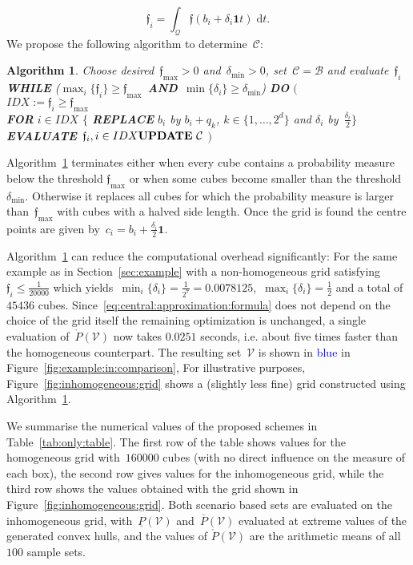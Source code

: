 \documentclass[letterpaper, 10pt, conference]{ieeeconf} %
\newtheorem{algo}[thm]{Algorithm}
\providecommand{\bfa}[1]{\mathbf{#1}}
\begin{document}
\[
\mathfrak{f}_i=\int_{\mathcal Q}\mathfrak{f}(b_i+\delta_i\bfa{1} t) \; \mathrm d t.
\]
%
We propose the following algorithm to determine~$\mathcal C$:
%
\begin{algo}\label{algo:non:homo:cubes}
Choose desired~$\mathfrak{f}_{\max}>0$ and~$\delta_{\min}>0$, set~$\mathcal C=\mathcal B$ and evaluate~$\mathfrak{f}_i$\\
\textbf{WHILE} ($\max_i\{\mathfrak{f}_i\}\geq\mathfrak{f}_{\max}$~\textbf{AND}~$\min\{\delta_i\}\geq\delta_{\min}$) \textbf{DO} $\bigl($\\
$IDX := \mathfrak{f}_i\geq \mathfrak{f}_{\max}$\\
\textbf{FOR} $i\in IDX$ $\{$ \textbf{REPLACE} $b_i$ by $b_i+q_k$, $k\in\{1,\dots,2^d\}$ 
and $\delta_i$ by~$\frac{\delta_i}{2}\}$\\
\textbf{EVALUATE}~$\mathfrak f_i, i\in IDX\\
\textbf{UPDATE}~\mathcal C$
$\bigr)$
\end{algo}
%
Algorithm~\ref{algo:non:homo:cubes} terminates either when every cube contains a probability measure below the threshold $\mathfrak{f}_{\max}$ or when some cubes become smaller than the threshold $\delta_{\min}$. Otherwise it replaces all cubes for which the probability measure is larger than~$\mathfrak{f}_{\max}$ with cubes with a halved side length.
%
Once the grid is found the centre points are given by~$c_i=b_i+\frac{\delta_i}{2}\bfa{1}$.
%


%
Algorithm~\ref{algo:non:homo:cubes} can reduce the computational overhead significantly:
%
For the same example as in Section~\ref{sec:example} with a non-homogeneous grid satisfying~$\mathfrak{f}_i\leq\frac{1}{20000}$ which yields~$\min_i\{\delta_i\}=\frac{1}{2^7}=0.0078125$,~$\max_i\{\delta_i\}=\frac{1}{2}$ and a total of~$45436$ cubes.
%
Since~\eqref{eq:central:approximation:formula} does not depend on the choice of the grid itself the remaining optimization is unchanged, a single evaluation of~$\mathring{P}(\mathcal V)$ now takes $0.0251$ seconds,
i.e. about five times  faster than the homogeneous counterpart. The resulting set~$\mathcal V$ is shown in \textcolor{blue}{blue} in Figure~\ref{fig:example:in:comparison},
%
For illustrative purposes, Figure~\ref{fig:inhomogeneous:grid} shows a (slightly less fine) grid constructed using Algorithm~\ref{algo:non:homo:cubes}.

%
We summarise the numerical values of the proposed schemes in Table~\ref{tab:only:table}.
%
The first row of the table shows values for the homogeneous grid with~$160000$ cubes (with no direct influence on the measure of each box), the second row gives values for the inhomogeneous grid, while the third row shows the values obtained with the grid shown in Figure~\ref{fig:inhomogeneous:grid}. 
%
Both scenario based sets are evaluated on the inhomogeneous grid, with~$\underline{P}(\mathcal V)$ and~$\overline{P}(\mathcal V)$ evaluated at extreme values of the generated convex hulls, and the values of $\mathring{P}(\mathcal V)$ are the  arithmetic means of all $100$ sample sets.
%
\end{document}
